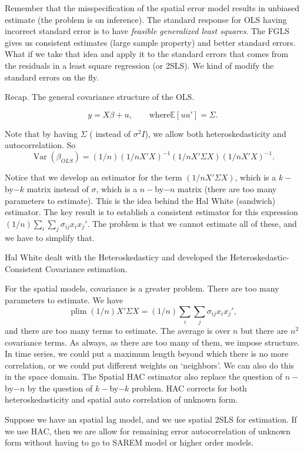 \documentclass[11pt,a4paper]{amsart}
\theoremstyle{plain}
\theoremstyle{definition}
\begin{document}
Remember that the misspecification of the spatial error model results in unbiased estimate (the problem is on inference). The standard response for OLS having incorrect standard error is to have \textit{feasible generalized least squares}.  The FGLS gives us consistent estimates (large sample property) and better standard errors. What if we take that idea and apply it to the standard errors  that comes from  the residuals in a least square regression (or 2SLS). We kind of modify the standard errors on the fly. 

Recap. The general covariance structure of the OLS.

\[	y = X\beta + u, \qquad \text{where} \mathbb{E}[uu'] = \Sigma.	\]

Note that by having $\Sigma$ ( instead of $\sigma^{2}I$), we allow both heteroskedasticity and autocorrelatiion. So
\[	\operatorname{Var}(\beta_{OLS}) = (1/n)(1/n X'X)^{-1}(1/nX'\Sigma X)(1/nX'X)^{-1}.	\]

Notice that we develop an estimator for the term $(1/nX'\Sigma X)$, which is a $k-$by$-k$ matrix instead of $\sigma$, which is a $n-$by$-n$ matrix (there are too many parameters to estimate). This is the idea behind the Hal White (sandwich) estimator. The key result is to establish a consistent estimator for this expression $(1/n)\sum_{i}\sum_{j}\sigma_{ij}x_{i}x_{j}'$. The problem is that we cannot estimate all of these, and we have to simplify that. 

Hal White dealt with the Heteroskedasticy and developed the Heteroskedastic-Consistent Covariance estimation. 

For the spatial models, covariance is a greater problem. There are too many parameters to estimate. We have 
\[	\operatorname{plim} (1/n)X'\Sigma X = (1/n)\sum_{i}\sum_{j}\sigma_{ij} x_{i}x_{j}', \]
and there are too many terms to estimate. The average is over $n$ but there are $n^{2}$ covariance terms. As always, as there are too many of them, we impose structure. In time series, we could put a maximum length beyond which there is no more correlation, or we could put different weights on `neighbors'. We can also do this in the space domain. The Spatial HAC estimator also replace the question of $n-$by$-n$ by the question of $k-$by$-k$ problem. HAC corrects for  both heteroskedasticity and spatial auto correlation of unknown form.

Suppose we have an spatial lag model, and we use spatial 2SLS for estimation.  If we use HAC, then we are allow for remaining error autocorrelation of unknown form without having to go to SAREM model or higher order models.
\end{document}
